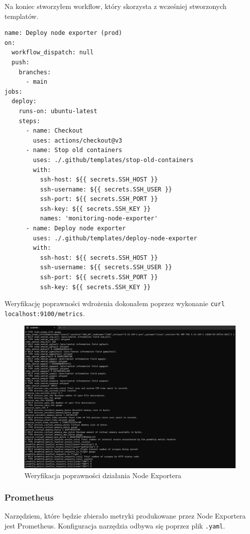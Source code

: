 \documentclass{article}
\begin{document}
Na koniec stworzyłem workflow, który skorzysta z wcześniej stworzonych templatów.

\begin{lstlisting}[caption=Plik \texttt{.github/workflows/prod-deploy-node-exporter.yml}]
name: Deploy node exporter (prod)
on:
  workflow_dispatch: null
  push:
    branches:
      - main
jobs:
  deploy:
    runs-on: ubuntu-latest
    steps:
      - name: Checkout
        uses: actions/checkout@v3
      - name: Stop old containers
        uses: ./.github/templates/stop-old-containers
        with:
          ssh-host: ${{ secrets.SSH_HOST }}
          ssh-username: ${{ secrets.SSH_USER }}
          ssh-port: ${{ secrets.SSH_PORT }}
          ssh-key: ${{ secrets.SSH_KEY }}
          names: 'monitoring-node-exporter'
      - name: Deploy node exporter
        uses: ./.github/templates/deploy-node-exporter
        with:
          ssh-host: ${{ secrets.SSH_HOST }}
          ssh-username: ${{ secrets.SSH_USER }}
          ssh-port: ${{ secrets.SSH_PORT }}
          ssh-key: ${{ secrets.SSH_KEY }}

\end{lstlisting}

Weryfikację poprawności wdrożenia dokonałem poprzez wykonanie \lstinline|curl localhost:9100/metrics|.

\begin{figure}[H]
    \centering
    \includegraphics[width=0.75\linewidth]{metrykiNodeExporterRaw.png}
    \caption{Weryfikacja poprawności działania Node Exportera}
    \label{fig:enter-label}
\end{figure}

\subsubsection{Prometheus}

Narzędziem, które będzie zbierało metryki produkowane przez Node Exportera jest Prometheus. Konfiguracja narzędzia odbywa się poprzez plik \lstinline|.yaml|.
\end{document}
